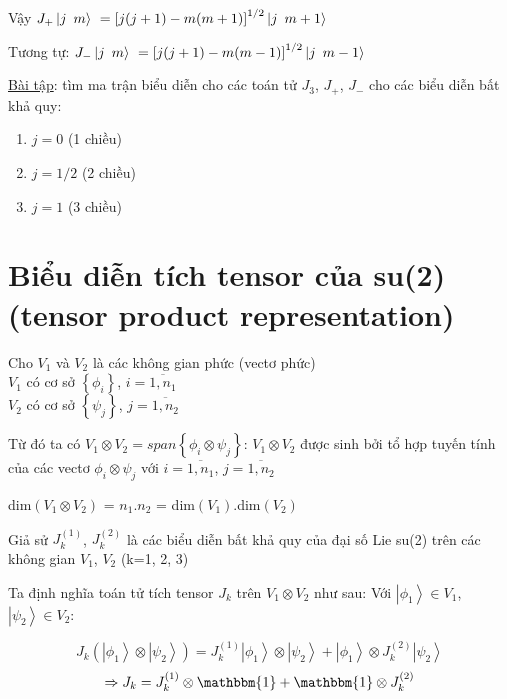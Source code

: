 \documentclass{report}
\begin{document}
Vậy \( J_{+} \left| j \enskip m \right\rangle\ = \left[ j(j+1) - m(m+1) \right]^{1/2} \left| j \enskip m + 1 \right\rangle\ \)

Tương tự: \( J_{-} \left| j \enskip m \right\rangle\ = \left[ j(j+1) - m(m-1) \right]^{1/2} \left| j \enskip m - 1 \right\rangle\ \)

\underline{Bài tập}: tìm ma trận biểu diễn cho các toán tử \( J_{3} \), \( J_{+} \), \( J_{-} \) cho các biểu diễn bất khả quy:

	\begin{enumerate}
		\item \( j = 0 \) (1 chiều)
		\item \( j = 1/2 \) (2 chiều)
		\item \( j = 1 \) (3 chiều)
	\end{enumerate}

\section{Biểu diễn tích tensor của su(2) (tensor product representation)}

Cho \(V_{1}\) và  \(V_{2}\) là các không gian phức (vectơ phức) \\
\hspace*{1cm} \( V_{1}\) có cơ sở \( \left\lbrace \phi_{i} \right\rbrace \), \( i = \overline{1,n_{1}} \) \\
\hspace*{1cm} \( V_{2}\) có cơ sở \( \left\lbrace \psi_{j} \right\rbrace \), \( j = \overline{1,n_{2}} \)

Từ đó ta có \( V_{1} \otimes V_{2} = span \left\lbrace \phi_{i} \otimes \psi_{j} \right\rbrace \): \( V_{1} \otimes V_{2} \) được sinh bởi tổ hợp tuyến tính của các vectơ \( \phi_{i} \otimes \psi_{j} \) với \( i = \overline{1,n_{1}} \), \( j = \overline{1,n_{2}} \)

dim\( \left( V_{1} \otimes V_{2} \right) \) = \(n_{1}.n_{2}\) = dim\(\left( V_{1} \right)\).dim\(\left( V_{2} \right) \)

Giả sử \(J_{k}^{(1)}\), \(J_{k}^{(2)}\) là các biểu diễn bất khả quy của đại số Lie su(2) trên các không gian \(V_{1}\), \(V_{2}\) (k=1, 2, 3)

Ta định nghĩa toán tử tích tensor \(J_{k}\) trên  \( V_{1} \otimes V_{2} \) như sau: Với \( \left| \phi_{1} \right\rangle \in V_{1} \), \( \left| \psi_{2} \right\rangle \in V_{2} \):

		\[ J_{k} \left( \left| \phi_{1} \right\rangle \otimes \left| \psi_{2} \right\rangle \right) = J_{k}^{(1)} \left| \phi_{1} \right\rangle \otimes \left| \psi_{2} \right\rangle + \left| \phi_{1} \right\rangle \otimes J_{k}^{(2)} \left| \psi_{2} \right\rangle \]
		\[ \Rightarrow J_{k} = J_{k}^{(1)} \otimes \mathbbm{1} +  \mathbbm{1} \otimes J_{k}^{(2)} \]  
\end{document}
